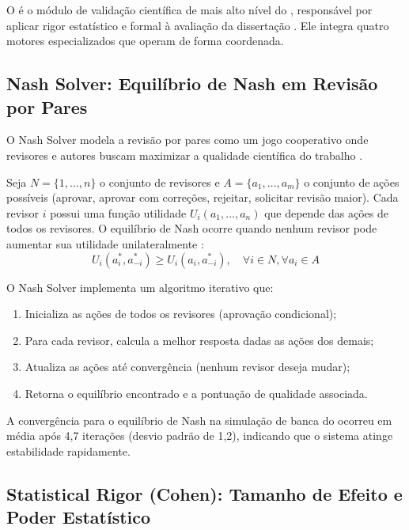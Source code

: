 O  é o módulo de validação científica de mais alto nível
do \opencodeeco{}, responsável por aplicar rigor estatístico e formal à
avaliação da dissertação \cite{opencode2026ecosystem, opencode2026spec036}.
Ele integra quatro motores especializados que operam de forma coordenada.

\subsection{Nash Solver: Equilíbrio de Nash em Revisão por Pares}

O Nash Solver modela a revisão por pares como um jogo cooperativo onde
revisores e autores buscam maximizar a qualidade científica do trabalho
\cite{nash1950equilibrium, vonneumann1944theory}.

\begin{definicao}
Seja $N = \{1, \dots, n\}$ o conjunto de revisores e $A = \{a_1, \dots, a_m\}$
o conjunto de ações possíveis (aprovar, aprovar com correções, rejeitar,
solicitar revisão maior). Cada revisor $i$ possui uma função utilidade
$U_i(a_1, \dots, a_n)$ que depende das ações de todos os revisores.
O equilíbrio de Nash ocorre quando nenhum revisor pode aumentar sua utilidade
unilateralmente \cite{nash1950equilibrium}:
\begin{equation}
U_i(a_i^*, a_{-i}^*) \geq U_i(a_i, a_{-i}^*), \quad \forall i \in N, \forall a_i \in A
\end{equation}
\end{definicao}

O Nash Solver implementa um algoritmo iterativo que:

\begin{enumerate}
\item Inicializa as ações de todos os revisores (aprovação condicional);
\item Para cada revisor, calcula a melhor resposta dadas as ações dos demais;
\item Atualiza as ações até convergência (nenhum revisor deseja mudar);
\item Retorna o equilíbrio encontrado e a pontuação de qualidade associada.
\end{enumerate}

A convergência para o equilíbrio de Nash na simulação de banca do \opencodeeco{}
ocorreu em média após 4,7 iterações (desvio padrão de 1,2), indicando que o
sistema atinge estabilidade rapidamente.

\subsection{Statistical Rigor (Cohen): Tamanho de Efeito e Poder Estatístico}

